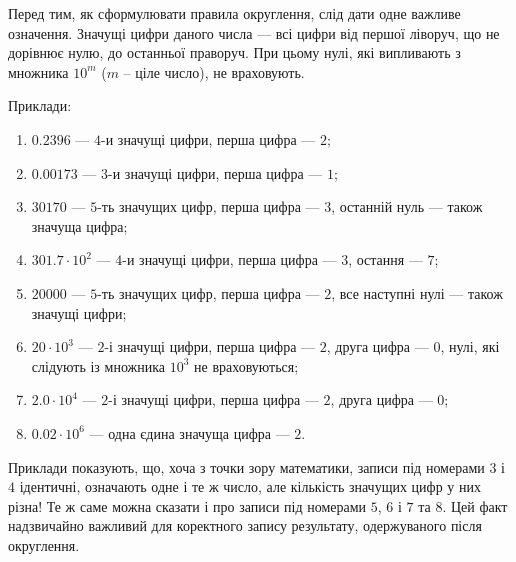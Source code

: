 \documentclass{LabBook}
\begin{document}
Перед тим, як сформулювати правила округлення, слід дати одне важливе означення.
Значущі цифри даного числа --- всі цифри від першої ліворуч, що не дорівнює нулю, до останньої праворуч. При цьому нулі, які випливають з множника $10^m$ ($m$ -- ціле число), не враховують.

Приклади:

\begin{enumerate}
	\item $0.2396$ --- $4$-и значущі цифри, перша цифра --- $2$;
	\item $0.00173$ --- $3$-и значущі цифри, перша цифра --- $1$;
	\item $30170$ --- $5$-ть значущих цифр, перша цифра --- $3$, останній нуль --- також значуща цифра;
	\item $301.7\cdot10^2$ --- $4$-и значущі цифри, перша цифра --- $3$, остання --- $7$;
	\item $20000$ --- $5$-ть значущих цифр, перша цифра --- $2$, все наступні нулі --- також значущі цифри;
	\item $20\cdot10^3$ --- $2$-і значущі цифри, перша цифра --- $2$, друга цифра --- $0$, нулі, які слідують із множника $10^3$ не враховуються;
	\item $2.0\cdot10^4$ --- $2$-і значущі цифри, перша цифра --- $2$, друга цифра --- $0$;
	\item $0.02 \cdot 10^6$ --- одна єдина значуща цифра --- $2$.
\end{enumerate}

Приклади показують, що, хоча з точки зору математики, записи під номерами $3$ і $4$ ідентичні, означають одне і те ж число, але кількість значущих цифр у них різна! Те ж саме можна сказати і про записи під номерами $5$, $6$ і $7$ та $8$. Цей факт надзвичайно важливий для коректного запису результату, одержуваного після округлення.
\end{document}
